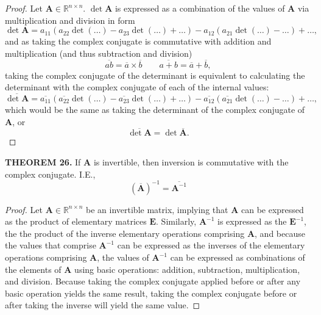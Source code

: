 \documentclass[12pt]{article}
\newcommand{\mat}[1]{\mathbf{#1}}
\newcommand{\theorem}[2]{\textbf{THEOREM #1.} #2}
\begin{document}
\begin{proof}
Let $\mat{A} \in \mathbb{R}^{n \times n}.$ $\det \mat{A}$ is expressed as a combination of the values of $\mat{A}$ via multiplication and division in form
\begin{equation*}
\det \mat{A} = a_{11} ( a_{22} \det (\dots) - a_{23} \det (\dots) + \dots ) - a_{12} ( a_{21} \det(\dots) - \dots ) + \dots,
\end{equation*}
and as taking the complex conjugate is commutative with addition and multiplication (and thus subtraction and division)
\begin{equation*}
\overline{ab} = \overline{a} \times \overline{b} \hspace{2em} \overline{a+b} = \overline{a} + \overline{b},
\end{equation*}
taking the complex conjugate of the determinant is equivalent to calculating the determinant with the complex conjugate of each of the internal values: 
\begin{equation*}
\overline{\det \mat{A}} = \overline{a_{11}} ( \overline{a_{22}} \det (\dots) - \overline{a_{23}} \det (\dots) + \dots ) - \overline{a_{12}} ( \overline{a_{21}} \det(\dots) - \dots ) + \dots,
\end{equation*}
which would be the same as taking the determinant of the complex conjugate of $\mat{A}$, or
\begin{equation*}
\overline{\det \mat{A}} = \det \overline{\mat{A}}.
\end{equation*}
\end{proof}

\theorem{26}{If $\mat{A}$ is invertible, then inversion is commutative with the complex conjugate. I.E., 
\begin{equation*}
\left(\overline{\mat{A}}\right)^{-1} = \overline{\mat{A}^{-1}}
\end{equation*}}

\begin{proof}
Let $\mat{A} \in \mathbb{R}^{n \times n}$ be an invertible matrix, implying that $\mat{A}$ can be expressed as the product of elementary matrices $\mat{E}$. Similarly, $\mat{A}^{-1}$ is expressed as the $\mat{E}^{-1}$, the the product of the inverse elementary operations comprising $\mat{A}$, and because the values that comprise $\mat{A}^{-1}$ can be expressed as the inverses of the elementary operations comprising $\mat{A}$, the values of $\mat{A}^{-1}$ can be expressed as combinations of the elements of $\mat{A}$ using basic operations: addition, subtraction, multiplication, and division. Because taking the complex conjugate applied before or after any basic operation yields the same result, taking the complex conjugate before or after taking the inverse will yield the same value. 
\end{proof}
\end{document}
